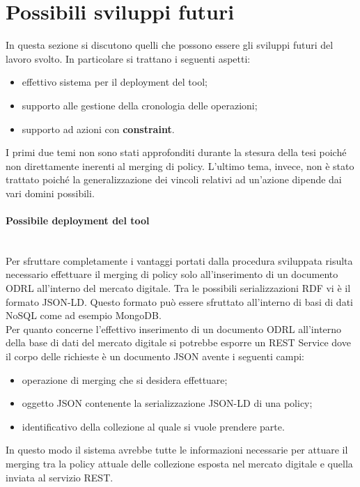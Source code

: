 \documentclass[12pt,a4paper,twoside]{book}
\begin{document}
\section{Possibili sviluppi futuri}
In questa sezione si discutono quelli che possono essere gli sviluppi futuri del lavoro svolto. In particolare si trattano i seguenti aspetti:
\begin{itemize}
\item effettivo sistema per il deployment del tool;
\item supporto alle gestione della cronologia delle operazioni;
\item supporto ad azioni con \textbf{constraint}.
\end{itemize}
I primi due temi non sono stati approfonditi durante la stesura della tesi poiché non direttamente inerenti al merging di policy. L'ultimo tema, invece, non è stato trattato poiché la generalizzazione dei vincoli relativi ad un'azione dipende dai vari domini possibili. 
\paragraph{Possibile deployment del tool}\mbox{}\\
Per sfruttare completamente i vantaggi portati dalla procedura sviluppata risulta necessario effettuare il merging di policy solo all'inserimento di un documento ODRL all'interno del mercato digitale. Tra le possibili serializzazioni RDF vi è il formato JSON-LD. Questo formato può essere sfruttato all'interno di basi di dati NoSQL come ad esempio MongoDB.\\
Per quanto concerne l'effettivo inserimento di un documento ODRL all'interno della base di dati del mercato digitale si potrebbe esporre un REST Service dove il corpo delle richieste è un documento JSON avente i seguenti campi:
\begin{itemize}
\item operazione di merging che si desidera effettuare;
\item oggetto JSON contenente la serializzazione JSON-LD di una policy;
\item identificativo della collezione al quale si vuole prendere parte.
\end{itemize}
In questo modo il sistema avrebbe tutte le informazioni necessarie per attuare il merging tra la policy attuale delle collezione esposta nel mercato digitale e quella inviata al servizio REST.
\end{document}
